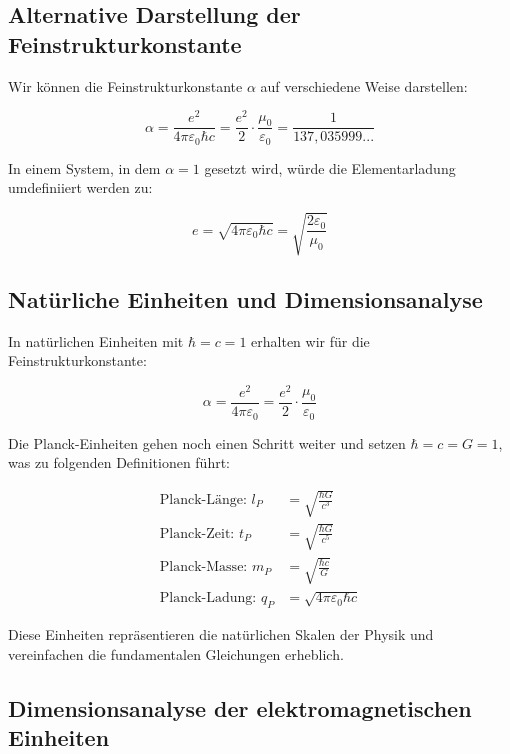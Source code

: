 \documentclass{article}
\begin{document}
	\subsection{Alternative Darstellung der Feinstrukturkonstante}
	
	Wir können die Feinstrukturkonstante $\alpha$ auf verschiedene Weise darstellen:
	
	\begin{equation}
		\alpha = \frac{e^2}{4\pi\varepsilon_0\hbar c} = \frac{e^2}{2} \cdot \frac{\mu_0}{\varepsilon_0} = \frac{1}{137,035999...}
	\end{equation}
	
	In einem System, in dem $\alpha = 1$ gesetzt wird, würde die Elementarladung umdefiniiert werden zu:
	
	\begin{equation}
		e = \sqrt{4\pi\varepsilon_0\hbar c} = \sqrt{\frac{2\varepsilon_0}{\mu_0}}
	\end{equation}
	
	\subsection{Natürliche Einheiten und Dimensionsanalyse}
	
	In natürlichen Einheiten mit $\hbar = c = 1$ erhalten wir für die Feinstrukturkonstante:
	
	\begin{equation}
		\alpha = \frac{e^2}{4\pi\varepsilon_0} = \frac{e^2}{2} \cdot \frac{\mu_0}{\varepsilon_0}
	\end{equation}
	
	Die Planck-Einheiten gehen noch einen Schritt weiter und setzen $\hbar = c = G = 1$, was zu folgenden Definitionen führt:
	
	\begin{align}
		\text{Planck-Länge: } l_P &= \sqrt{\frac{\hbar G}{c^3}} \\
		\text{Planck-Zeit: } t_P &= \sqrt{\frac{\hbar G}{c^5}} \\
		\text{Planck-Masse: } m_P &= \sqrt{\frac{\hbar c}{G}} \\
		\text{Planck-Ladung: } q_P &= \sqrt{4\pi\varepsilon_0\hbar c}
	\end{align}
	
	Diese Einheiten repräsentieren die natürlichen Skalen der Physik und vereinfachen die fundamentalen Gleichungen erheblich.
	
	\subsection{Dimensionsanalyse der elektromagnetischen Einheiten}
	
\end{document}

